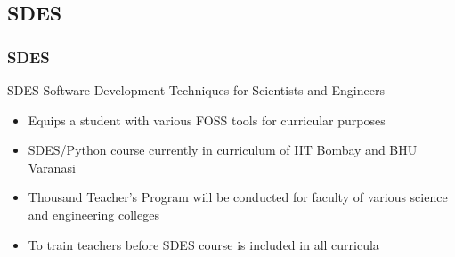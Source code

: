\documentclass[compress,red]{beamer} %
\begin{document}
\subsection{SDES}
\begin{frame}
\frametitle{SDES}
\begin{block}{SDES}
Software Development Techniques for Scientists and Engineers
\end{block}
\begin{itemize}
\item Equips a student with various FOSS tools for curricular purposes \pause
\item SDES/Python course currently in curriculum of IIT Bombay and BHU Varanasi \pause
\item \alert{Thousand Teacher's Program} will be conducted for faculty of various science and engineering colleges \pause
\item To train teachers before SDES course is included in all curricula
\end{itemize}
\end{frame}


\end{document}
